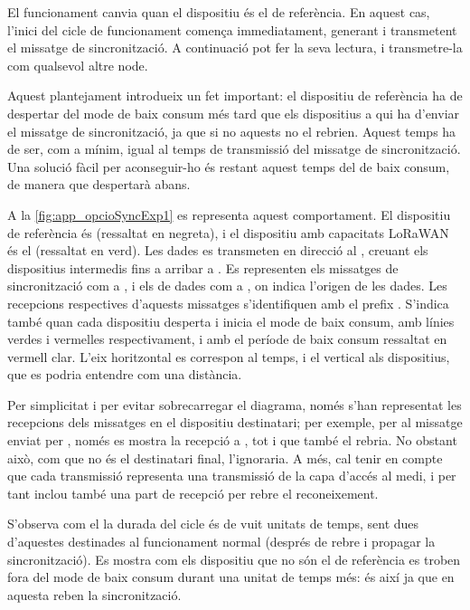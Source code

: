 \documentclass{tfgitic}[2024/07/01]
\begin{document}
{El funcionament canvia quan el dispositiu és el de referència. En aquest cas, l'inici del cicle de funcionament comença immediatament, generant i transmetent el missatge de sincronització. A continuació pot fer la seva lectura, i transmetre-la com qualsevol altre node.

Aquest plantejament introdueix un fet important: el dispositiu de referència ha de despertar del mode de baix consum més tard que els dispositius a qui ha d'enviar el missatge de sincronització, ja que si no aquests no el rebrien. Aquest temps ha de ser, com a mínim, igual al temps de transmissió del missatge de sincronització. Una solució fàcil per aconseguir-ho és restant aquest temps del de baix consum, de manera que despertarà abans. 

A la \autoref{fig:app_opcioSyncExp1} es representa aquest comportament. El dispositiu de referència és  (ressaltat en negreta), i el dispositiu amb capacitats LoRaWAN és el  (ressaltat en verd). Les dades es transmeten en direcció al , creuant els dispositius intermedis fins a arribar a . Es representen els missatges de sincronització com a , i els de dades com a , on  indica l'origen de les dades. Les recepcions respectives d'aquests missatges s'identifiquen amb el prefix . S'indica també quan cada dispositiu desperta i inicia el mode de baix consum, amb línies verdes i vermelles respectivament, i amb el període de baix consum ressaltat en vermell clar. L'eix horitzontal es correspon al temps, i el vertical als dispositius, que es podria entendre com una distància.

Per simplicitat i per evitar sobrecarregar el diagrama, només s'han representat les recepcions dels missatges en el dispositiu destinatari; per exemple, per al missatge  enviat per , només es mostra la recepció a , tot i que  també el rebria. No obstant això, com que no és el destinatari final, l'ignoraria. A més, cal tenir en compte que cada transmissió representa una transmissió de la capa d'accés al medi, i per tant inclou també una part de recepció per rebre el reconeixement.

S'observa com el la durada del cicle és de vuit unitats de temps, sent dues d'aquestes destinades al funcionament normal (després de rebre i propagar la sincronització). Es mostra com els dispositiu que no són el de referència es troben fora del mode de baix consum durant una unitat de temps més: és així ja que en aquesta reben la sincronització.

}
\end{document}

